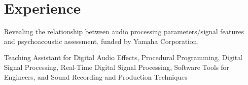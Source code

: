 \documentclass[letterpaper]{deedy-resume} %
\begin{document}
{\begin{minipage}[t]{0.33\textwidth}

\end{minipage} %
\hfill
%
%
\begin{minipage}[t]{0.66\textwidth} %


\section{Experience}

\hspace{-0.1cm}
\vspace{\topsep} %

\hspace{-0.1cm}
\vspace{\topsep} %

\hspace{-0.1cm}
\vspace{\topsep} %
\begin{tightitemize}
\item Revealing the relationship between audio processing parameters/signal features and psychoacoustic assessment, funded by Yamaha Corporation. 
\item Teaching Assistant for Digital Audio Effects, Procedural Programming, Digital Signal Processing, Real-Time Digital Signal Processing, Software Tools for Engineers, and Sound Recording and Production Techniques
\end{tightitemize}


\end{minipage}}
\end{document}
